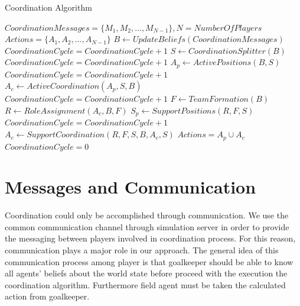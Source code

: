 \begin{algorithm}[ht!]
\caption{Coordination Algorithm }
\label{CoordinationAlgorithm}
\begin{algorithmic}[1]
\begin{small}
$Coordination Messages = \lbrace M_{1},M_{2},...,M_{N-1} \rbrace, N = Number Of Players $
$Actions = \lbrace A_{1},A_{2},...,A_{N-1} \rbrace$
\STATE $B \leftarrow Update Beliefs(Coordination Messages) $
\STATE $CoordinationCycle = CoordinationCycle + 1$
\STATE $S \leftarrow Coordination Splitter(B) $
\STATE $CoordinationCycle = CoordinationCycle + 1$
\STATE $A_{p} \leftarrow Active Positions(B,S) $
\STATE $CoordinationCycle = CoordinationCycle + 1$
\STATE $A_{c} \leftarrow Active Coordination(A_{p},S,B) $
\STATE $CoordinationCycle = CoordinationCycle + 1$
\STATE $ F \leftarrow TeamFormation(B) $
\STATE $ R \leftarrow Role Assignment(A_{c},B,F) $
\STATE $ S_{p} \leftarrow Support Positions(R,F,S) $
\STATE $CoordinationCycle = CoordinationCycle + 1$
\STATE $A_{c} \leftarrow Support Coordination(R,F,S,B,A_{c},S) $
\STATE $Actions = A_{p} \cup A_{c}$
\STATE $CoordinationCycle = 0$
\ENDIF
\end{small}
\end{algorithmic}
\end{algorithm}


\section{Messages and Communication}
Coordination could only be accomplished through communication. We use the common communication channel through simulation server in order to provide the messaging between players involved in coordination process. For this reason, communication plays a major role in our approach. The general idea of this communication process among player is that goalkeeper should be able to know all agents' beliefs about the world state before proceed with the execution the coordination algorithm. Furthermore field agent must be taken the calculated action from goalkeeper. 

